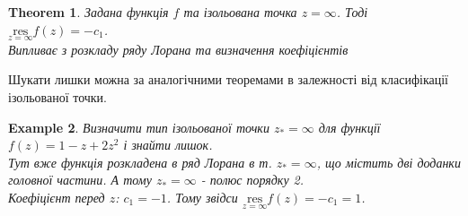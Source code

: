 \documentclass[a4paper, 10pt]{article}
\def\residue#1#2{\underset{z = {#1}}{\textrm{res}} {#2}}
\theoremstyle{theoremdd}
\newtheorem{theorem}{Theorem}[subsection]
\theoremstyle{theoremdd}
\theoremstyle{theoremdd}
\theoremstyle{theoremdd}
\newtheorem{example}[theorem]{Example}
\theoremstyle{theoremdd}
\theoremstyle{theoremdd}
\theoremstyle{theoremdd}
\theoremstyle{theoremdd}
\begin{document}
\begin{theorem}
Задана функція $f$ та ізольована точка $z = \infty$. Тоді $\residue{\infty}{f(z)} = -c_1$.\\
\textit{Випливає з розкладу ряду Лорана та визначення коефіцієнтів}
\end{theorem}

Шукати лишки можна за аналогічними теоремами в залежності від класифікації ізольованої точки.

\begin{example}
Визначити тип ізольованої точки $z_* = \infty$ для функції $f(z) = 1 - z + 2z^2$ і знайти лишок.\\
Тут вже функція розкладена в ряд Лорана в т. $z_* = \infty$, що містить дві доданки головної частини. А тому $z_* = \infty$ - полюс порядку 2.\\
Коефіцієнт перед $z$: $c_1 = -1$. Тому звідси $\residue{\infty}{f(z)} = -c_1 = 1$.
\end{example}
\end{document}
